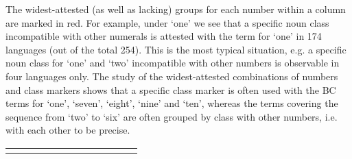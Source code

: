  The widest-attested (as well as lacking) groups for each number within a column are marked in red. For example, under ‘one’ we see that a specific noun class  incompatible with other numerals is attested with the term for ‘one’ in 174 languages (out of the total 254). This is the most typical situation, e.g. a specific noun class for ‘one’ and ‘two’ incompatible with other numbers is observable in four languages only. The study of the widest-attested combinations of numbers and class markers shows that a specific class marker is often used with the BC terms for ‘one’, ‘seven’, ‘eight’, ‘nine’ and ‘ten’, whereas the terms covering the sequence from ‘two’ to ‘six’ are often grouped by class with other numbers, i.e. with each other to be precise. 


\begin{table}
\begin{tabularx}{\textwidth}{lXXXXXXXXXXX}
\lsptoprule


\end{tabularx}
\end{table}

